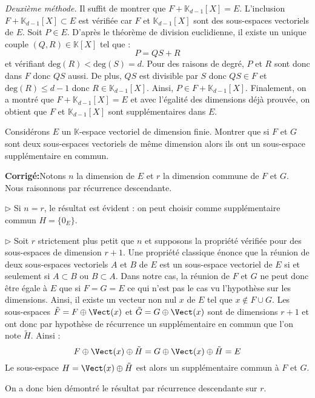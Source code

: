 \documentclass[a4paper,twoside,french,10pt]{VcCours}
\newcommand{\corr}{\textbf{Corrigé:}}
\begin{document}
\begin{enumerate}
\textit{Deuxième méthode.}  Il suffit de montrer que $F + \mathbb{K}_{d-1}[X]=E$. L'inclusion  $ F + \mathbb{K}_{d-1}[X] \subset E$ est vérifiée car $F$ et $\mathbb{K}_{d-1}[X]$ sont des sous-espaces vectoriels de $E$. Soit $P \in E$. D'après le théorème de division euclidienne, il existe un unique couple $(Q,R) \in \mathbb{K}[X]$ tel que :
$$ P = QS+R$$
et vérifiant $\textrm{deg}(R) < \textrm{deg}(S) = d$. Pour des raisons de degré, $P$ et $R$ sont donc dans $F$ donc $QS$ aussi. De plus, $QS$ est divisible par $S$ donc $QS \in F$ et $\textrm{deg}(R) \leq d-1$ donc $R \in \mathbb{K}_{d-1}[X]$. Ainsi, $P \in F + \mathbb{K}_{d-1}[X]$. Finalement, on a montré que $F + \mathbb{K}_{d-1}[X]=E$ et avec l'égalité des dimensions déjà prouvée, on obtient que $F$ et $\mathbb{K}_{d-1}[X]$ sont supplémentaires dans $E$.
\end{enumerate}

\medskip


\begin{Exercice}{} Considérons $E$ un $\mathbb{K}$-espace vectoriel de dimension finie. Montrer que si $F$ et $G$ sont deux sous-espaces vectoriels de même dimension alors ils ont un sous-espace supplémentaire en commun.
\end{Exercice}

\corr Notons $n$ la dimension de $E$ et $r$ la dimension commune de $F$ et $G$. Nous raisonnons par récurrence descendante.

\medskip

$\rhd$ Si $n=r$, le résultat est évident : on peut choisir comme supplémentaire commun $H = \lbrace 0_E \rbrace$.

\medskip

$\rhd$ Soit $r$ strictement plus petit que $n$ et supposons la propriété vérifiée pour des sous-espaces de dimension $r+1$. Une propriété classique énonce que la réunion de deux sous-espaces vectoriels $A$ et $B$ de $E$ est un sous-espace vectoriel de $E$ si et seulement si $A \subset B$ ou $B \subset A$. Dans notre cas, la réunion de $F$ et $G$ ne peut donc être égale à $E$ que si $F=G=E$ ce qui n'est pas le cas vu l'hypothèse sur les dimensions. Ainsi, il existe un vecteur non nul $x$ de $E$ tel que $x \notin F \cup G$. Les sous-espaces $\tilde{F}= F \oplus \Vect(x)$ et $\tilde{G}= G \oplus \Vect(x)$ sont de dimensions $r+1$ et ont donc par hypothèse de récurrence un supplémentaire en commun que l'on note $\tilde{H}$. Ainsi :
$$  F \oplus \Vect(x) \oplus \tilde{H} =  G \oplus \Vect(x) \oplus \tilde{H} = E$$
Le sous-espace $H=\Vect(x) \oplus \tilde{H}$ est alors un supplémentaire commun à $F$ et $G$.

\medskip

On a donc bien démontré le résultat par récurrence descendante sur $r$.
\end{document}
